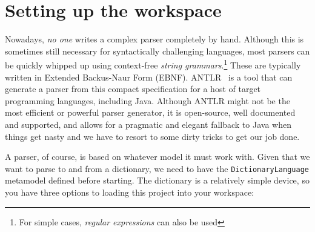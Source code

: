 \newpage
\section{Setting up the workspace}
\genHeader

Nowadays, \emph{no one} writes a complex parser completely by hand. Although this is sometimes still necessary for syntactically challenging languages, most
parsers can be quickly whipped up using context-free \emph{string grammars}.\footnote{For simple cases, \emph{regular expressions} can also be used} These are
typically written in Extended Backus-Naur Form (EBNF). ANTLR~\cite{ANTLR} is a tool that can generate a parser from this compact specification for
a host of target programming languages, including Java. Although ANTLR might not be the most efficient or powerful parser generator, it is open-source, well
documented and supported, and allows for a pragmatic and elegant fallback to Java when things get nasty and we have to resort to some dirty tricks to get our
job done.

A parser, of course, is based on whatever model it must work with. Given that we want to parse to and from a dictionary, we need to have the
\texttt{DictionaryLanguage} metamodel defined before starting. The dictionary is a relatively simple device, so you have three options to loading this project
into your workspace:


